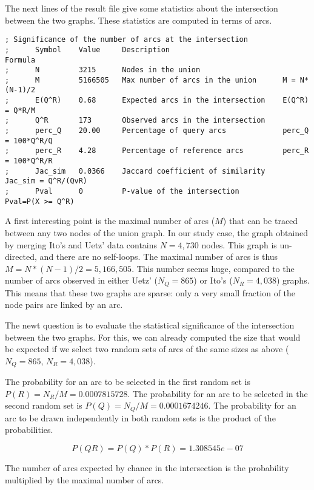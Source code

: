 \begin{enumerate}
The next lines of the result file give some statistics about the
intersection between the two graphs. These statistics are computed in
terms of arcs.

\begin{footnotesize}
\begin{verbatim}
; Significance of the number of arcs at the intersection
;      Symbol    Value     Description                          Formula
;      N         3215      Nodes in the union                  
;      M         5166505   Max number of arcs in the union      M = N*(N-1)/2
;      E(Q^R)    0.68      Expected arcs in the intersection    E(Q^R) = Q*R/M
;      Q^R       173       Observed arcs in the intersection
;      perc_Q    20.00     Percentage of query arcs             perc_Q = 100*Q^R/Q
;      perc_R    4.28      Percentage of reference arcs         perc_R = 100*Q^R/R
;      Jac_sim   0.0366    Jaccard coefficient of similarity    Jac_sim = Q^R/(QvR)
;      Pval      0         P-value of the intersection          Pval=P(X >= Q^R)
\end{verbatim}
\end{footnotesize}

A first interesting point is the maximal number of arcs ($M$) that can
be traced between any two nodes of the union graph. In our study case,
the graph obtained by merging Ito's and Uetz' data contains $N=4,730$
nodes. This graph is un-directed, and there are no self-loops. The
maximal number of arcs is thus $M=N*(N-1)/2=5,166,505$. This number
seems huge, compared to the number of arcs observed in either Uetz'
($N_Q=865$) or Ito's ($N_R=4,038$) graphs. This means that these two graphs
are sparse: only a very small fraction of the node pairs are linked by
an arc.

The newt question is to evaluate the statistical significance of the
intersection between the two graphs. For this, we can already computed
the size that would be expected if we select two random sets of arcs
of the same sizes as above ($N_Q=865$, $N_R=4,038$). 

The probability for an arc to be selected in the first random set is
$P(R) = N_R/M = 0.0007815728$. The probability for an arc to be
selected in the second random set is $P(Q) = N_Q/M =
0.0001674246$. The probability for an arc to be drawn independently in
both random sets is the product of the probabilities. 

\[P(QR) = P(Q)*P(R) = 1.308545e-07\]

The number of arcs expected by chance in the intersection is the
probability multiplied by the maximal number of arcs.


\end{enumerate}

